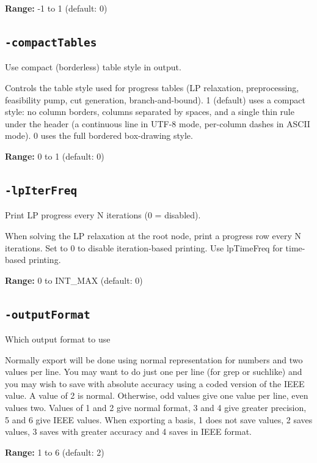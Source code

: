 \documentclass[11pt,a4paper]{article}
\begin{document}
\textbf{Range:} -1 to 1 (default: 0)

\subsection*{\texttt{-compactTables}}

Use compact (borderless) table style in output.

Controls the table style used for progress tables (LP relaxation, preprocessing, feasibility pump, cut generation, branch-and-bound). 1 (default) uses a compact style: no column borders, columns separated by spaces, and a single thin rule under the header (a continuous line in UTF-8 mode, per-column dashes in ASCII mode). 0 uses the full bordered box-drawing style.

\textbf{Range:} 0 to 1 (default: 0)

\subsection*{\texttt{-lpIterFreq}}

Print LP progress every N iterations (0 = disabled).

When solving the LP relaxation at the root node, print a progress row every N iterations. Set to 0 to disable iteration-based printing. Use lpTimeFreq for time-based printing.

\textbf{Range:} 0 to INT\_MAX (default: 0)

\subsection*{\texttt{-outputFormat}}

Which output format to use

Normally export will be done using normal representation for numbers and two values per line.  You may want to do just one per line (for grep or suchlike) and you may wish to save with absolute accuracy using a coded version of the IEEE value. A value of 2 is normal. Otherwise, odd values give one value per line, even values two.  Values of 1 and 2 give normal format, 3 and 4 give greater precision, 5 and 6 give IEEE values.  When exporting a basis, 1 does not save values, 2 saves values, 3 saves with greater accuracy and 4 saves in IEEE format.

\textbf{Range:} 1 to 6 (default: 2)
\end{document}
